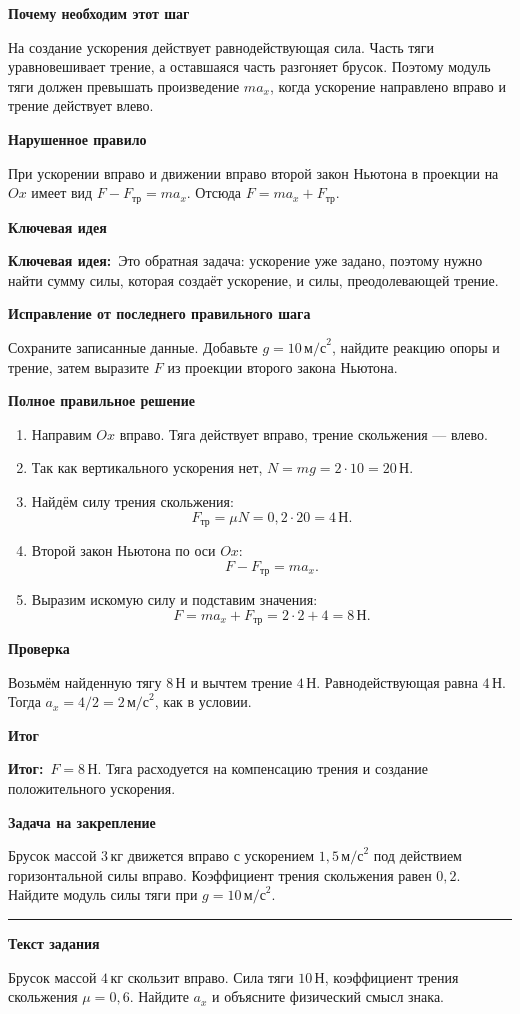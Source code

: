 \documentclass[a4paper,12pt]{article}
\newcommand{\reviewtitle}[1]{\noindent{\Large\bfseries\color{deepaccent}Задание №#1}\par\vspace{2mm}\noindent\rule{\linewidth}{0.35pt}\vspace{2mm}}
\newcommand{\subblock}[1]{\par\medskip\textbf{\color{deepaccent}#1}\par\vspace{-2pt}}
\newcommand{\keyidea}{\textcolor{ideablue}{\textbf{Ключевая идея:}}}
\newcommand{\resultlabel}{\textcolor{deepaccent}{\textbf{Итог:}}}
\begin{document}
\subblock{Почему необходим этот шаг}
На создание ускорения действует равнодействующая сила. Часть тяги уравновешивает трение, а оставшаяся часть разгоняет брусок. Поэтому модуль тяги должен превышать произведение $ma_x$, когда ускорение направлено вправо и трение действует влево.

\subblock{Нарушенное правило}
При ускорении вправо и движении вправо второй закон Ньютона в проекции на $Ox$ имеет вид $F-F_{\text{тр}}=ma_x$. Отсюда $F=ma_x+F_{\text{тр}}$.

\subblock{Ключевая идея}
\keyidea\ Это обратная задача: ускорение уже задано, поэтому нужно найти сумму силы, которая создаёт ускорение, и силы, преодолевающей трение.

\subblock{Исправление от последнего правильного шага}
Сохраните записанные данные. Добавьте $g=10\,\text{м/с}^2$, найдите реакцию опоры и трение, затем выразите $F$ из проекции второго закона Ньютона.

\subblock{Полное правильное решение}
\begin{enumerate}
\item Направим $Ox$ вправо. Тяга действует вправо, трение скольжения --- влево.
\item Так как вертикального ускорения нет, $N=mg=2\cdot10=20\,\text{Н}$.
\item Найдём силу трения скольжения:
\[F_{\text{тр}}=\mu N=0{,}2\cdot20=4\,\text{Н}.\]
\item Второй закон Ньютона по оси $Ox$:
\[F-F_{\text{тр}}=ma_x.\]
\item Выразим искомую силу и подставим значения:
\[
F=ma_x+F_{\text{тр}}=2\cdot2+4=\boxed{8\,\text{Н}}.
\]
\end{enumerate}

\subblock{Проверка}
Возьмём найденную тягу $8\,\text{Н}$ и вычтем трение $4\,\text{Н}$. Равнодействующая равна $4\,\text{Н}$. Тогда $a_x=4/2=2\,\text{м/с}^2$, как в условии.

\subblock{Итог}
\resultlabel\ $\boxed{F=8\,\text{Н}}$. Тяга расходуется на компенсацию трения и создание положительного ускорения.

\subblock{Задача на закрепление}
Брусок массой $3\,\text{кг}$ движется вправо с ускорением $1{,}5\,\text{м/с}^2$ под действием горизонтальной силы вправо. Коэффициент трения скольжения равен $0{,}2$. Найдите модуль силы тяги при $g=10\,\text{м/с}^2$.

\clearpage
{}\label{task:10}
\reviewtitle{10}
\subblock{Текст задания}
Брусок массой $4\,\text{кг}$ скользит вправо. Сила тяги $10\,\text{Н}$, коэффициент трения скольжения $\mu=0{,}6$. Найдите $a_x$ и объясните физический смысл знака.
\end{document}
